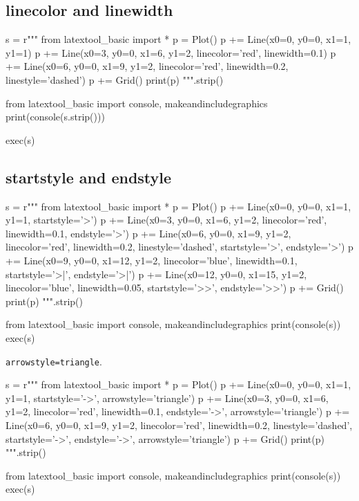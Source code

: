 \subsection{linecolor and linewidth}

\begin{python}
s = r"""
from latextool_basic import *
p = Plot()
p += Line(x0=0, y0=0, x1=1, y1=1)
p += Line(x0=3, y0=0, x1=6, y1=2, linecolor='red', linewidth=0.1)
p += Line(x0=6, y0=0, x1=9, y1=2, linecolor='red', linewidth=0.2, 
                                  linestyle='dashed')
p += Grid()
print(p)
""".strip()

from latextool_basic import console, makeandincludegraphics
print(console(s.strip()))

exec(s)
\end{python}




\newpage
\subsection{startstyle and endstyle}

\begin{python}
s = r"""
from latextool_basic import *
p = Plot()
p += Line(x0=0, y0=0, x1=1, y1=1, startstyle='>')
p += Line(x0=3, y0=0, x1=6, y1=2, linecolor='red', linewidth=0.1, 
                                  endstyle='>')
p += Line(x0=6, y0=0, x1=9, y1=2, linecolor='red', linewidth=0.2, 
                                  linestyle='dashed', 
                                  startstyle='>', endstyle='>')
p += Line(x0=9, y0=0, x1=12, y1=2, linecolor='blue', linewidth=0.1,  
                                   startstyle='>|', endstyle='>|')
p += Line(x0=12, y0=0, x1=15, y1=2, linecolor='blue', linewidth=0.05,  
                                   startstyle='>>', endstyle='>>')
p += Grid()
print(p)
""".strip()

from latextool_basic import console, makeandincludegraphics
print(console(s))
exec(s)
\end{python}




\newpage
\verb!arrowstyle=triangle!.

\begin{python}
s = r"""
from latextool_basic import *
p = Plot()
p += Line(x0=0, y0=0, x1=1, y1=1, startstyle='->', arrowstyle='triangle')
p += Line(x0=3, y0=0, x1=6, y1=2, linecolor='red', linewidth=0.1, 
                                  endstyle='->', arrowstyle='triangle')
p += Line(x0=6, y0=0, x1=9, y1=2, linecolor='red', linewidth=0.2, 
                                  linestyle='dashed', 
                                  startstyle='->', endstyle='->', 
                                  arrowstyle='triangle')
p += Grid()
print(p)
""".strip()

from latextool_basic import console, makeandincludegraphics
print(console(s))
exec(s)
\end{python}




